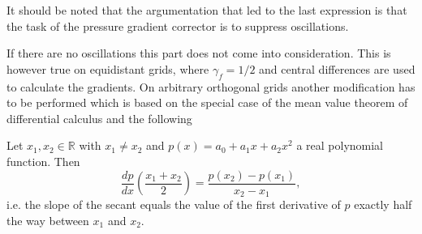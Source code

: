   It should be noted that the argumentation that led to the last expression is that the task of the pressure gradient corrector is to suppress oscillations. 
  
  If there are no oscillations this part does not come into consideration. This is however true on equidistant grids, where \(\gamma_f = 1/2\) and central differences are used to calculate the gradients. On arbitrary orthogonal grids another modification has to be performed which is based on the special case of the mean value theorem of differential calculus and the following 
\begin{prop}
  Let \(x_1,x_2 \in \mathbb{R}\) with \(x_1 \neq x_2\) and \(p(x) = a_0 + a_1 x + a_2 x^2\) a real polynomial function. Then 
  \begin{displaymath}
    \frac{dp}{dx}\left(\frac{x_1+x_2}{2}\right) = \frac{p(x_2) - p(x_1)}{x_2 - x_1},
  \end{displaymath}
  i.e. the slope of the secant equals the value of the first derivative of \(p\) exactly half the way between \(x_1\) and \(x_2\).
\end{prop}

